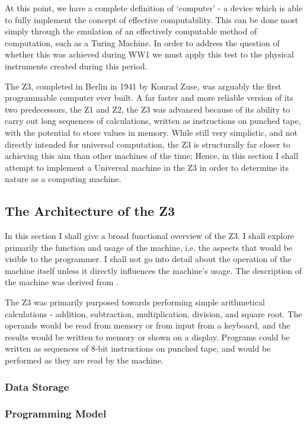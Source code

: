 \documentclass[Master.tex]{subfiles}
\begin{document}
At this point, we have a complete definition of `computer' - a device which is able to fully implement the concept of effective computability. This can be done most simply through the emulation of an effectively computable method of computation, such as a Turing Machine. In order to address the question of whether this was achieved during WW1 we must apply this test to the physical instruments created during this period.

The Z3, completed in Berlin in 1941 by Konrad Zuse, was arguably the first programmable computer ever built. A far faster and more reliable version of its two predecessors, the Z1 and Z2, the Z3 was advanced because of its ability to carry out long sequences of calculations, written as instructions on punched tape, with the potential to store values in memory. While still very simplistic, and not directly intended for universal computation, the Z3 is structurally far closer to achieving this aim than other machines of the time; Hence, in this section I shall attempt to implement a Universal machine in the Z3 in order to determine its nature as a computing machine.

\subsection{The Architecture of the Z3}

In this section I shall give a broad functional overview of the Z3. I shall explore primarily the function and usage of the machine, i.e. the aspects that would be visible to the programmer. I shall not go into detail about the operation of the machine itself unless it directly influences the machine's usage. The description of the machine was derived from \cite{rojas1997z3architecture}.

The Z3 was primarily purposed towards performing simple arithmetical calculations - addition, subtraction, multiplication, division, and square root. The operands would be read from memory or from input from a keyboard, and the results would be written to memory or shown on a display. Programs could be written as sequences of 8-bit instructions on punched tape, and would be performed as they are read by the machine.

  
\subsubsection{Data Storage}

\subsubsection{Programming Model}
\end{document}
